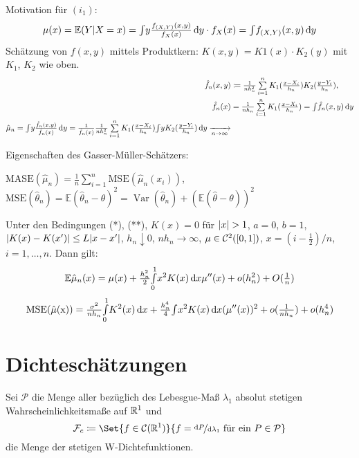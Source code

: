 \documentclass{cheat-sheet}
\newcommand{\E}{\mathbb{E}} %
\newcommand{\Cont}{\mathcal{C}} %
\DeclareMathOperator{\var}{Var} %
\begin{document}
Motivation für $(i_1)$:
\[
  \mu(x) = \E(Y|X=x) = \IInt{y \tfrac{f_{(X,Y)}(x,y)}{f_X(x)}}{y} \cdot f_X(x) = \IInt{f_{(X,Y)} (x,y)}{y}
\]
Schätzung von $f(x,y)$ mittels Produktkern: $K(x, y) = K1(x) \cdot K_2(y)$ mit $K_1$, $K_2$ wie oben. %
\begin{align*}
  \hat{f}_n(x, y) & \coloneqq \tfrac{1}{n h_n^2} \sum_{i=1}^n K_1(\tfrac{x-X_i}{h_n}) K_2(\tfrac{y-Y_i}{h_n}), \\
  \hat{f}_n(x) & = \tfrac{1}{n h_n} \sum_{i=1}^n K_1(\tfrac{x - X_i}{h_n}) = \IInt{\hat{f}_n(x,y)}{y} \\
  \hat{\mu}_n = \IInt{y \tfrac{\hat{f}_n(x,y)}{\hat{f}_n(x)}}{y} = \tfrac{1}{\hat{f}_n(x)} \tfrac{1}{n h_n^2} \sum_{i=1}^n K_1(\tfrac{x - X_i}{h_n}) \IInt{y K_2(\tfrac{y - Y_i}{h_n})}{y} \xra[n \to \infty]{} 
\end{align*}

Eigenschaften des Gasser-Müller-Schätzers:

$\mathrm{MASE}(\hat{\mu}_n) = \tfrac{1}{n} \sum_{i=1}^n \mathrm{MSE}(\hat{\mu}_n (x_i))$, $\mathrm{MSE}(\hat{\theta}_n) = \E (\hat{\theta}_n - \theta)^2 = \var(\hat{\theta}_n) + (\E (\hat{\theta} - \theta))^2$

\begin{satz}
  Unter den Bedingungen (*), (**), $K(x) = 0$ für $\lvert x\rvert > 1$, $a=0$, $b=1$, $\lvert K(x) - K(x')\rvert \leq L \lvert x - x'\rvert$, $h_n \downarrow 0$, $n h_n \to \infty$, $\mu \in \Cont^2(\cinterval{0}{1})$, $x = (i - \tfrac{1}{2}) / n$, $i = 1, \ldots, n$.
  Dann gilt:
  \[
    \E \hat{\mu}_n(x) = \mu(x) + \tfrac{h_n^2}{2} \Int{0}{1}{x^2 K(x)}{x} \mu''(x) + o(h_n^2) + O(\tfrac{1}{n})
  \]
  \[
    \mathrm{MSE(\hat{\mu}(x))} = \tfrac{\sigma^2}{n h_n} {\textstyle \int\limits_{0}^{1}} K^2 (x) \,\mathrm{d} x + \tfrac{h_n^4}{4} {\textstyle \int} x^2 K(x) \,\mathrm{d} x (\mu''(x))^2 + o(\tfrac{1}{n h_n}) + o(h_n^4)
  \]
\end{satz}


\section{Dichteschätzungen}


\begin{nota}
  Sei $\mathcal{P}$ die Menge aller bezüglich des Lebesgue-Maß $\lambda_1$ absolut stetigen Wahrscheinlichkeitsmaße auf $\mathbb{R}^1$ und
  \[ \mathcal{F}_c \coloneqq \Set{f \in \Cont(\R^1)}{f = \nicefrac{\d P}{\d \lambda_1} \text{ für ein } P \in \mathcal{P}} \]
  die Menge der stetigen W-Dichtefunktionen.
\end{nota}
\end{document}

